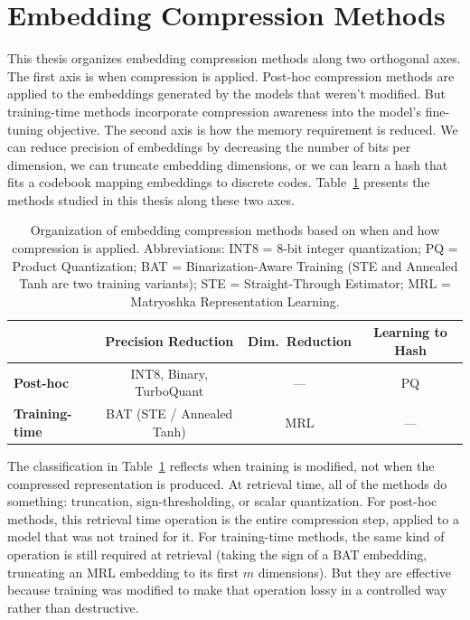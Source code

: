 \section{Embedding Compression Methods}
\label{sec:compression_bg}

This thesis organizes embedding compression methods along two orthogonal axes. The first axis is when compression is applied. Post-hoc compression methods are applied to the embeddings generated by the models that weren't modified. But training-time methods incorporate compression awareness into the model's fine-tuning objective. The second axis is how the memory requirement is reduced. We can reduce precision of embeddings by decreasing the number of bits per dimension, we can truncate embedding dimensions, or we can learn a hash that fits a codebook mapping embeddings to discrete codes. Table~\ref{tab:compression-taxonomy} presents the methods studied in this thesis along these two axes.

\begin{table}[H]
  \centering
  \caption[Organization of embedding compression methods studied in this thesis]{Organization of embedding compression methods based on when and how compression is applied. Abbreviations: INT8 = 8-bit integer quantization; PQ = Product Quantization; BAT = Binarization-Aware Training (STE and Annealed Tanh are two training variants); STE = Straight-Through Estimator; MRL = Matryoshka Representation Learning.}
  \label{tab:compression-taxonomy}
  \begin{tabular}{| l | c | c | c |}
    \hline
                            & \textbf{Precision Reduction} & \textbf{Dim.\ Reduction} & \textbf{Learning to Hash} \\ [0.5ex] \hline
    \textbf{Post-hoc}       & INT8, Binary, TurboQuant     & ---                      & PQ                        \\ \hline
    \textbf{Training-time}  & BAT (STE / Annealed Tanh)    & MRL                      & ---                       \\ \hline
  \end{tabular}
\end{table}

The classification in Table~\ref{tab:compression-taxonomy} reflects when training is modified, not when the compressed representation is produced. At retrieval time, all of the methods do something: truncation, sign-thresholding, or scalar quantization. For post-hoc methods, this retrieval time operation is the entire compression step, applied to a model that was not trained for it. For training-time methods, the same kind of operation is still required at retrieval (taking the sign of a BAT embedding, truncating an MRL embedding to its first $m$ dimensions). But they are effective because training was modified to make that operation lossy in a controlled way rather than destructive.

